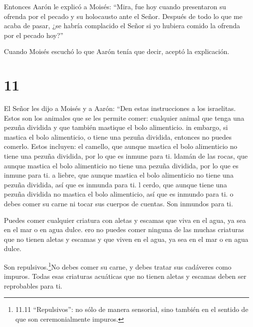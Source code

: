  Entonces Aarón le explicó a Moisés: ``Mira, fue hoy cuando
presentaron su ofrenda por el pecado y su holocausto ante el Señor.
Después de todo lo que me acaba de pasar, ¿se habría complacido el Señor
si yo hubiera comido la ofrenda por el pecado hoy?''

 Cuando Moisés escuchó lo que Aarón tenía que decir, aceptó
la explicación.

\hypertarget{section-10}{%
\section{11}\label{section-10}}

 El Señor les dijo a Moisés y a Aarón:  ``Den
estas instrucciones a los israelitas. Estos son los animales que se les
permite comer:  cualquier animal que tenga una pezuña
dividida y que también mastique el bolo alimenticio.  in
embargo, si mastica el bolo alimenticio, o tiene una pezuña dividida,
entonces no puedes comerlo. Estos incluyen: el camello, que aunque
mastica el bolo alimenticio no tiene una pezuña dividida, por lo que es
inmune para ti.  ldamán de las rocas, que aunque mastica el
bolo alimenticio no tiene una pezuña dividida, por lo que es inmune para
ti.  a liebre, que aunque mastica el bolo alimenticio no
tiene una pezuña dividida, así que es inmunda para ti.  l
cerdo, que aunque tiene una pezuña dividida no mastica el bolo
alimenticio, así que es inmundo para ti.  o debes comer su
carne ni tocar sus cuerpos de cuentas. Son inmundos para ti.

 Puedes comer cualquier criatura con aletas y escamas que
viva en el agua, ya sea en el mar o en agua dulce.  ero no
puedes comer ninguna de las muchas criaturas que no tienen aletas y
escamas y que viven en el agua, ya sea en el mar o en agua dulce.

 Son repulsivos.\footnote{11.11 ``Repulsivos'': no sólo de
  manera sensorial, sino también en el sentido de que son
  ceremonialmente impuros.}No debes comer su carne, y debes tratar sus
cadáveres como impuros.  Todas esas criaturas acuáticas que
no tienen aletas y escamas deben ser reprobables para ti.

